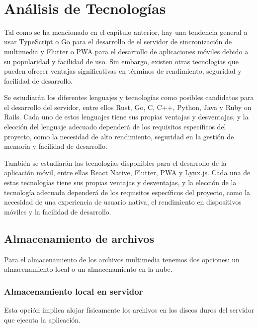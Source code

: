 ~
\chapter{Análisis de Tecnologías}
\label{sec:tecnologias}


Tal como se ha mencionado en el capítulo anterior, hay una tendencia general a usar TypeScript o Go para el desarrollo de el servidor de sincronización de multimedia y Flutter o PWA para el desarrollo de aplicaciones móviles debido a su popularidad y facilidad de uso.
Sin embargo, existen otras tecnologías que pueden ofrecer ventajas significativas en términos de rendimiento, seguridad y facilidad de desarrollo.

Se estudiarán los diferentes lenguajes y tecnologías como posibles candidatos para el desarrollo del servidor, entre ellos Rust, Go, C, C++, Python, Java y Ruby on Rails. Cada uno de estos lenguajes tiene sus propias ventajas y desventajas, y la elección del lenguaje adecuado dependerá de los requisitos específicos del proyecto, como la necesidad de alto rendimiento, seguridad en la gestión de memoria y facilidad de desarrollo.

También se estudiarán las tecnologías disponibles para el desarrollo de la aplicación móvil, entre ellas React Native, Flutter, PWA y Lynx.js. Cada una de estas tecnologías tiene sus propias ventajas y desventajas, y la elección de la tecnología adecuada dependerá de los requisitos específicos del proyecto, como la necesidad de una experiencia de usuario nativa, el rendimiento en dispositivos móviles y la facilidad de desarrollo.

\section{Almacenamiento de archivos}

Para el almacenamiento de los archivos multimedia tenemos dos opciones: un almacenamiento local o un almacenamiento en la nube.

\subsection{Almacenamiento local en servidor}
Esta opción implica alojar físicamente los archivos en los discos duros del servidor que ejecuta la aplicación.


